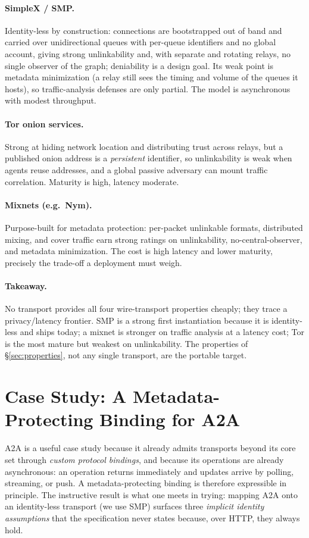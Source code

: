 \documentclass[10pt,twocolumn]{article}
\theoremstyle{definition}
\begin{document}
\paragraph{SimpleX / SMP.} Identity-less by construction: connections are
bootstrapped out of band and carried over unidirectional queues with per-queue
identifiers and no global account, giving strong unlinkability and, with separate
and rotating relays, no single observer of the graph; deniability is a design goal.
Its weak point is metadata minimization (a relay still sees the timing and volume
of the queues it hosts), so traffic-analysis defenses are only partial. The model
is asynchronous with modest throughput.

\paragraph{Tor onion services.} Strong at hiding network location and distributing
trust across relays, but a published onion address is a \emph{persistent}
identifier, so unlinkability is weak when agents reuse addresses, and a global
passive adversary can mount traffic correlation. Maturity is high, latency
moderate.

\paragraph{Mixnets (e.g.\ Nym).} Purpose-built for metadata protection: per-packet
unlinkable formats, distributed mixing, and cover traffic earn strong ratings on
unlinkability, no-central-observer, and metadata minimization. The cost is high
latency and lower maturity, precisely the trade-off a deployment must weigh.

\paragraph{Takeaway.} No transport provides all four wire-transport properties
cheaply; they trace a privacy/latency frontier. SMP is a strong first instantiation because it is
identity-less and ships today; a mixnet is stronger on traffic analysis at a
latency cost; Tor is the most mature but weakest on unlinkability. The properties
of \S\ref{sec:properties}, not any single transport, are the portable target.

\section{Case Study: A Metadata-Protecting Binding for A2A}\label{sec:casestudy}
A2A is a useful case study because it already admits transports beyond its core set
through \emph{custom protocol bindings}, and because its operations are already
asynchronous: an operation returns immediately and updates arrive by polling,
streaming, or push. A metadata-protecting binding is therefore expressible in
principle. The instructive result is what one meets in trying: mapping A2A onto an
identity-less transport (we use SMP) surfaces three \emph{implicit identity
assumptions} that the specification never states because, over HTTP, they always
hold.
\end{document}
